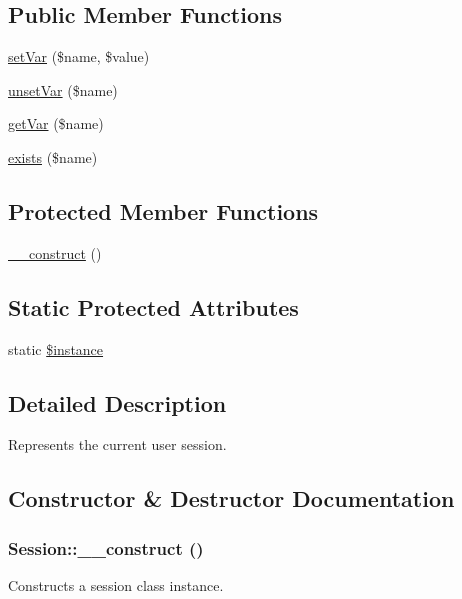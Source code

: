 \subsection*{Public Member Functions}
\begin{DoxyCompactItemize}
\item 
\hyperlink{classSession_aed85e756b6654874dfd6c94f0382d061}{setVar} (\$name, \$value)
\item 
\hyperlink{classSession_ac0b791332d81ad7f542edeee935d0db4}{unsetVar} (\$name)
\item 
\hyperlink{classSession_a8cbfa64ffa31a33a61d62d4396985e07}{getVar} (\$name)
\item 
\hyperlink{classSession_a1747aaae205a1e90e14cb9de48120cd8}{exists} (\$name)
\end{DoxyCompactItemize}
\subsection*{Protected Member Functions}
\begin{DoxyCompactItemize}
\item 
\hyperlink{classSession_a36373ba15d6c8f932aeea02d7320d7c8}{\_\-\_\-construct} ()
\end{DoxyCompactItemize}
\subsection*{Static Protected Attributes}
\begin{DoxyCompactItemize}
\item 
static \hyperlink{classSession_a86a6e52b2a48eeafaaff766db1973cef}{\$instance}
\end{DoxyCompactItemize}


\subsection{Detailed Description}
Represents the current user session. 

\subsection{Constructor \& Destructor Documentation}
\hypertarget{classSession_a36373ba15d6c8f932aeea02d7320d7c8}{
\subsubsection[{\_\-\_\-construct}]{\setlength{\rightskip}{0pt plus 5cm}Session::\_\-\_\-construct ()}}
\label{classSession_a36373ba15d6c8f932aeea02d7320d7c8}
Constructs a session class instance. 

